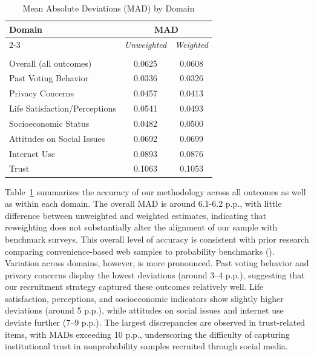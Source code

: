 \begin{table}[h]
\centering
\caption{Mean Absolute Deviations (MAD) by Domain}
\label{tab:mad_outcomes}
\vspace{0.5cm}
\begin{tabular}{l cc}
\hline\hline
\textbf{Domain} & \multicolumn{2}{c}{\textbf{MAD}} \\
\cline{2-3}
       & \textit{Unweighted} & \textit{Weighted} \\
\hline \vspace{-0.3cm} \\
\vspace{0.5cm}Overall (all outcomes)        & 0.0625 & 0.0608 \vspace{-0.3cm} \\ \hdashline
Past Voting Behavior          & 0.0336 & 0.0326 \\
Privacy Concerns              & 0.0457 & 0.0413 \\
Life Satisfaction/Perceptions & 0.0541 & 0.0493 \\
Socioeconomic Status          & 0.0482 & 0.0500 \\
Attitudes on Social Issues    & 0.0692 & 0.0699 \\
Internet Use                  & 0.0893 & 0.0876 \\
Trust                         & 0.1063 & 0.1053 \\
\hline\hline
\end{tabular}
\end{table}

Table~\ref{tab:mad_outcomes} summarizes the accuracy of our methodology across all outcomes as well as within each domain. The overall MAD is around 6.1-6.2 p.p., with little difference between unweighted and weighted estimates, indicating that reweighting does not substantially alter the alignment of our sample with benchmark surveys. This overall level of accuracy is consistent with prior research comparing convenience-based web samples to probability benchmarks (\citealt{goel2015non, yeager2011comparing, Mercer2018}). Variation across domains, however, is more pronounced. Past voting behavior and privacy concerns display the lowest deviations (around 3–4 p.p.), suggesting that our recruitment strategy captured these outcomes relatively well. Life satisfaction, perceptions, and socioeconomic indicators show slightly higher deviations (around 5 p.p.), while attitudes on social issues and internet use deviate further (7–9 p.p.). The largest discrepancies are observed in trust-related items, with MADs exceeding 10 p.p., underscoring the difficulty of capturing institutional trust in nonprobability samples recruited through social media.



